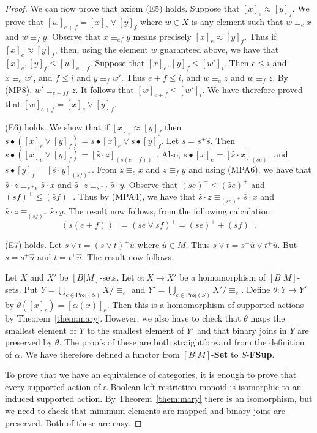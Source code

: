 \documentclass[10pt,a4paper]{amsart}
\begin{document}
\begin{proof}
We can now prove that axiom (E5) holds.
Suppose that  $[x]_{e} \approx [y]_{f}$.
We prove that
$[w]_{e + f} = [x]_{e} \vee [y]_{f}$
where $w \in X$ is any element such that 
$w \equiv_{e} x$ and $w \equiv_{f} y$.
Observe that $x \equiv_{ef} y$ means precisely $[x]_{e} \approx [y]_{f}$.
Thus if $[x]_{e} \approx [y]_{f}$, then, using the element $w$ guaranteed above,
we have that $[x]_{e}, [y]_{f} \leq [w]_{e + f}$.
Suppose that $[x]_{e}, [y]_{f} \leq [w']_{i}$.
Then $e \leq i$ and $x \equiv_{e} w'$, and $f \leq i$ and $y \equiv_{f} w'$.
Thus $e + f \leq i$, and $w \equiv_{e} z$ and $w \equiv_{f} z$.
By (MP8), $w' \equiv_{e + f f} z$.
It follows that $[w]_{e + f} \leq [w']_{i}$.
We have therefore proved that $[w]_{e + f} = [x]_{e} \vee [y]_{f}$.

(E6) holds.
We show that if $[x]_{e} \approx [y]_{f}$ then 
$s \bullet ([x]_{e} \vee [y]_{f}) = s \bullet [x]_{e} \vee s \bullet [y]_{f}$.
Let $s = s^{+}\hat{s}$.
Then $s \bullet ([x]_{e} \vee [y]_{f}) = [\hat{s} \cdot z]_{(s(e + f))^{+}}$.
Also, $s \bullet [x]_{e} = [\hat{s} \cdot x]_{(se)^{+}}$ and $s \bullet [y]_{f} = [\hat{s} \cdot y]_{(sf)^{+}}$.
From $z \equiv_{e} x$ and $z \equiv_{f} y$ and using (MPA6),
we have that $\hat{s} \cdot z \equiv_{\hat{s} \ast e} \hat{s} \cdot x$ and $\hat{s} \cdot z \equiv_{\hat{s} \ast f} \hat{s} \cdot y$.
Observe that $(se)^{+} \leq (\hat{s}e)^{+}$ and $(sf)^{+} \leq (\hat{s}f)^{+}$.
Thus by (MPA4), we have that 
$\hat{s} \cdot z \equiv_{(se)^{+}} \hat{s} \cdot x$ and $\hat{s} \cdot z \equiv_{(sf)^{+}} \hat{s} \cdot y$.
The result now follows, from the following calculation
$$(s(e+f))^{+} = (se \vee sf)^{+} = (se)^{+} + (sf)^{+}.$$

(E7) holds.
Let $s \vee t = (s \vee t)^{+}\hat{u}$ where $\hat{u} \in M$.
Thus $s \vee t = s^{+}\hat{u} \vee t^{+}\hat{u}$.
But $s = s^{+}\hat{u}$ and $t = t^{+}\hat{u}$.
The result now follows.

Let $X$ and $X'$ be $[B|M]$-sets.
Let $\alpha \colon X \rightarrow X'$ be a homomorphism of $[B|M]$-sets.
Put $Y = \bigcup_{e \in \mathsf{Proj}(S)} X/\equiv_{e}$
and
$Y' = \bigcup_{e \in \mathsf{Proj}(S)} X'/\equiv_{e}$.
Define $\theta \colon Y \rightarrow Y'$ by $\theta ([x]_{e}) = [\alpha (x)]_{e}$.
Then this is a homomorphism of supported actions by Theorem~\ref{them:mary}.
However, we also have to check that $\theta$ maps the smallest element of $Y$ to the smallest element of $Y'$
and that binary joins in $Y$ are preserved by $\theta$.
The proofs of these are both straightforward from the definition of $\alpha$.
We have therefore defined a functor from $[B|M]$-{\bf Set} to  $S$-{\bf FSup}.

To prove that we have an equivalence of categories, it is enough to prove that 
every supported action of a Boolean left restriction monoid is isomorphic to an induced supported action.
By Theorem~\ref{them:mary} there is an isomorphism,
but we need to check that minimum elements are mapped
and binary joins are preserved.
Both of these are easy.
\end{proof}
\end{document}
